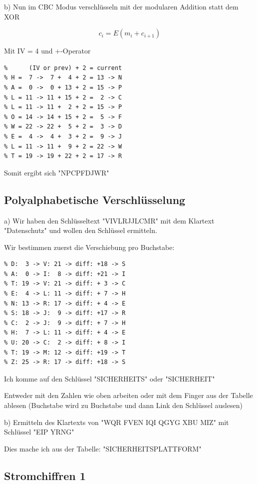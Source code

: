 \documentclass[a4paper]{article}
\begin{document}
b) Nun im CBC Modus verschlüsseln mit der modularen Addition statt dem XOR

$$c_i = E(m_i + c_{i+1})$$


Mit IV = 4 und +-Operator

\begin{lstlisting}
%      (IV or prev) + 2 = current
% H =  7 ->  7 +  4 + 2 = 13 -> N
% A =  0 ->  0 + 13 + 2 = 15 -> P
% L = 11 -> 11 + 15 + 2 =  2 -> C
% L = 11 -> 11 +  2 + 2 = 15 -> P
% O = 14 -> 14 + 15 + 2 =  5 -> F
% W = 22 -> 22 +  5 + 2 =  3 -> D
% E =  4 ->  4 +  3 + 2 =  9 -> J
% L = 11 -> 11 +  9 + 2 = 22 -> W
% T = 19 -> 19 + 22 + 2 = 17 -> R
\end{lstlisting}

Somit ergibt sich "NPCPFDJWR"

\subsection{Polyalphabetische Verschlüsselung}

a) Wir haben den Schlüsseltext "VIVLRJJLCMR" mit dem Klartext "Datenschutz" und wollen den Schlüssel ermitteln.

Wir bestimmen zuerst die Verschiebung pro Buchstabe:


\begin{lstlisting}
% D:  3 -> V: 21 -> diff: +18 -> S
% A:  0 -> I:  8 -> diff: +21 -> I
% T: 19 -> V: 21 -> diff: + 3 -> C
% E:  4 -> L: 11 -> diff: + 7 -> H
% N: 13 -> R: 17 -> diff: + 4 -> E
% S: 18 -> J:  9 -> diff: +17 -> R
% C:  2 -> J:  9 -> diff: + 7 -> H
% H:  7 -> L: 11 -> diff: + 4 -> E
% U: 20 -> C:  2 -> diff: + 8 -> I
% T: 19 -> M: 12 -> diff: +19 -> T
% Z: 25 -> R: 17 -> diff: +18 -> S
\end{lstlisting}

Ich komme auf den Schlüssel "SICHERHEITS" oder "SICHERHEIT"

Entweder mit den Zahlen wie oben arbeiten oder mit dem Finger aus der Tabelle ablesen (Buchstabe wird zu Buchstabe und dann Link den Schlüssel auslesen)

b) Ermitteln des Klartexts von "WQR FVEN IQI QGYG XBU MIZ" mit Schlüssel "EIP YRNG"

Dies mache ich aus der Tabelle: "SICHERHEITSPLATTFORM"

\subsection{Stromchiffren 1}
\end{document}
